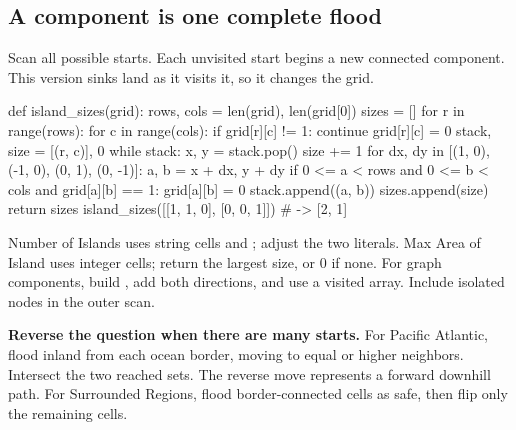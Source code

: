 \documentclass[11pt]{article}
\newcommand{\cd}[1]{{\frenchspacing\texttt{\detokenize{#1}}}}
\begin{document}
\subsection{A component is one complete flood}
Scan all possible starts. Each unvisited start begins a new connected component.
This version sinks land as it visits it, so it changes the grid.
\par\noindent\begin{minipage}{\linewidth}
\hypertarget{example-start-40}{}
\begin{pyex}
def island_sizes(grid):
    rows, cols = len(grid), len(grid[0])
    sizes = []
    for r in range(rows):
        for c in range(cols):
            if grid[r][c] != 1:
                continue
            grid[r][c] = 0
            stack, size = [(r, c)], 0
            while stack:
                x, y = stack.pop()
                size += 1
                for dx, dy in [(1, 0), (-1, 0), (0, 1), (0, -1)]:
                    a, b = x + dx, y + dy
                    if 0 <= a < rows and 0 <= b < cols and grid[a][b] == 1:
                        grid[a][b] = 0
                        stack.append((a, b))
            sizes.append(size)
    return sizes
island_sizes([[1, 1, 0], [0, 0, 1]])  # -> [2, 1]
\end{pyex}
\hypertarget{example-end-40}{}
\end{minipage}\par
Number of Islands uses string cells \cd{"1"} and \cd{"0"}; adjust the two literals.
Max Area of Island uses integer cells; return the largest size, or 0 if none.
For graph components, build \cd{adj = [[] for _ in range(n)]}, add both directions, and use a visited array.
Include isolated nodes in the outer scan.

\textbf{Reverse the question when there are many starts.}
For Pacific Atlantic, flood inland from each ocean border, moving to equal or higher neighbors.
Intersect the two reached sets. The reverse move represents a forward downhill path.
For Surrounded Regions, flood border-connected \cd{"O"} cells as safe, then flip only the remaining \cd{"O"} cells.
\end{document}
